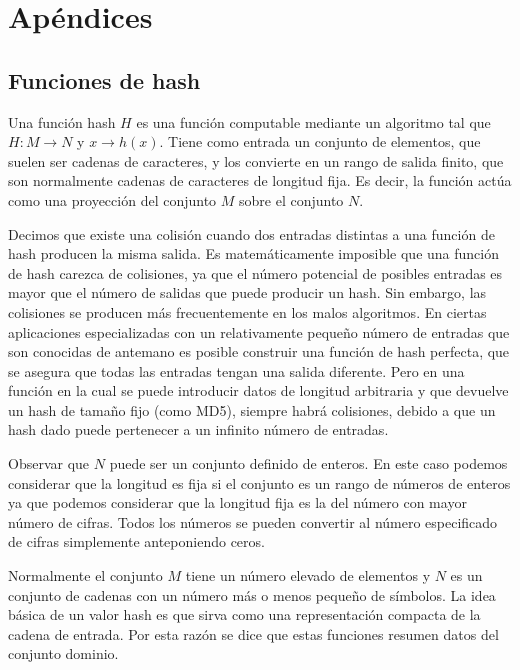 \documentclass[a4paper,12pt, oneside]{article}
\begin{document}
\clearpage\mbox{}\clearpage
\section{Apéndices}

\subsection{Funciones de hash}
Una función hash $H$ es una función computable mediante un algoritmo tal que $H: M \rightarrow N$ y $x \rightarrow h(x)$. Tiene como entrada un conjunto de elementos, que suelen ser cadenas de caracteres, y los convierte en un rango de salida finito, que son normalmente cadenas de caracteres de longitud fija. Es decir, la función actúa como una proyección del conjunto $M$ sobre el conjunto $N$\cite{Motwani:1995:RA:211390}.

Decimos que existe una colisión cuando dos entradas distintas a una función de hash producen la misma salida. Es matemáticamente imposible que una función de hash carezca de colisiones, ya que el número potencial de posibles entradas es mayor que el número de salidas que puede producir un hash. Sin embargo, las colisiones se producen más frecuentemente en los malos algoritmos. En ciertas aplicaciones especializadas con un relativamente pequeño número de entradas que son conocidas de antemano es posible construir una función de hash perfecta, que se asegura que todas las entradas tengan una salida diferente. Pero en una función en la cual se puede introducir datos de longitud arbitraria y que devuelve un hash de tamaño fijo (como MD5), siempre habrá colisiones, debido a que un hash dado puede pertenecer a un infinito número de entradas.

Observar que $N$ puede ser un conjunto definido de enteros. En este caso podemos considerar que la longitud es fija si el conjunto es un rango de números de enteros ya que podemos considerar que la longitud fija es la del número con mayor número de cifras. Todos los números se pueden convertir al número especificado de cifras simplemente anteponiendo ceros.

Normalmente el conjunto $M$ tiene un número elevado de elementos y $N$ es un conjunto de cadenas con un número más o menos pequeño de símbolos. La idea básica de un valor hash es que sirva como una representación compacta de la cadena de entrada. Por esta razón se dice que estas funciones resumen datos del conjunto dominio.
\end{document}
